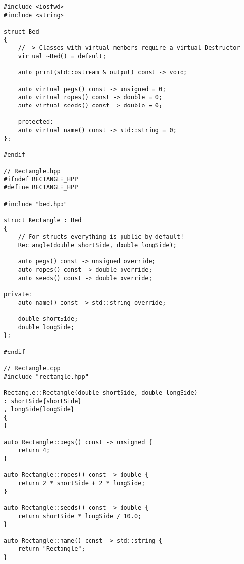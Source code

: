 \begin{multicols*}{3}
\begin{verbatim}
#include <iosfwd>
#include <string>

struct Bed
{
    // -> Classes with virtual members require a virtual Destructor
    virtual ~Bed() = default;

    auto print(std::ostream & output) const -> void;

    auto virtual pegs() const -> unsigned = 0;
    auto virtual ropes() const -> double = 0;
    auto virtual seeds() const -> double = 0;

    protected:
    auto virtual name() const -> std::string = 0;
};

#endif

// Rectangle.hpp
#ifndef RECTANGLE_HPP
#define RECTANGLE_HPP

#include "bed.hpp"

struct Rectangle : Bed
{
    // For structs everything is public by default!
    Rectangle(double shortSide, double longSide);

    auto pegs() const -> unsigned override;
    auto ropes() const -> double override;
    auto seeds() const -> double override;

private:
    auto name() const -> std::string override;

    double shortSide;
    double longSide;
};

#endif

// Rectangle.cpp
#include "rectangle.hpp"

Rectangle::Rectangle(double shortSide, double longSide)
: shortSide{shortSide}
, longSide{longSide}
{
}

auto Rectangle::pegs() const -> unsigned {
    return 4;
}

auto Rectangle::ropes() const -> double {
    return 2 * shortSide + 2 * longSide;
}

auto Rectangle::seeds() const -> double {
    return shortSide * longSide / 10.0;
}

auto Rectangle::name() const -> std::string {
    return "Rectangle";
}
\end{verbatim}


\end{multicols*}

